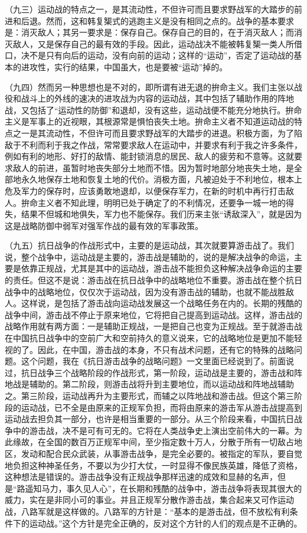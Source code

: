 （九三）运动战的特点之一，是其流动性，不但许可而且要求野战军的大踏步的前进和后退。然而，这和韩复榘式的逃跑主义是没有相同之点的。战争的基本要求是：消灭敌人；其另一要求是：保存自己。保存自己的目的，在于消灭敌人；而消灭敌人，又是保存自己的最有效的手段。因此，运动战决不能被韩复榘一类人所借口，决不是只有向后的运动，没有向前的运动；这样的“运动”，否定了运动战的基本的进攻性，实行的结果，中国虽大，也是要被“运动”掉的。

（九四）然而另一种思想也是不对的，即所谓有进无退的拚命主义。我们主张以战役和战斗上的外线的速决的进攻战为内容的运动战，其中包括了辅助作用的阵地战，又包括了“运动性的防御”和退却，没有这些，运动战便不能充分地执行。拚命主义是军事上的近视眼，其根源常是惧怕丧失土地。拚命主义者不知道运动战的特点之一是其流动性，不但许可而且要求野战军的大踏步的进退。积极方面，为了陷敌于不利而利于我之作战，常常要求敌人在运动中，并要求有利于我之许多条件，例如有利的地形、好打的敌情、能封锁消息的居民、敌人的疲劳和不意等。这就要求敌人的前进，虽暂时地丧失部分土地而不惜。因为暂时地部分地丧失土地，是全部地永久地保存土地和恢复土地的代价。消极方面，凡被迫处于不利地位，根本上危及军力的保存时，应该勇敢地退却，以便保存军力，在新的时机中再行打击敌人。拚命主义者不知此理，明明已处于确定了的不利情况，还要争一城一地的得失，结果不但城和地俱失，军力也不能保存。我们历来主张“诱敌深入”，就是因为这是战略防御中弱军对强军作战的最有效的军事政策。

（九五）抗日战争的作战形式中，主要的是运动战，其次就要算游击战了。我们说，整个战争中，运动战是主要的，游击战是辅助的，说的是解决战争的命运，主要是依靠正规战，尤其是其中的运动战，游击战不能担负这种解决战争命运的主要的责任。但这不是说：游击战在抗日战争中的战略地位不重要。游击战在整个抗日战争中的战略地位，仅仅次于运动战，因为没有游击战的辅助，也就不能战胜敌人。这样说，是包括了游击战向运动战发展这一个战略任务在内的。长期的残酷的战争中间，游击战不停止于原来地位，它将把自己提高到运动战。这样，游击战的战略作用就有两方面：一是辅助正规战，一是把自己也变为正规战。至于就游击战在中国抗日战争中的空前广大和空前持久的意义说来，它的战略地位是更加不能轻视的了。因此，在中国，游击战的本身，不只有战术问题，还有它的特殊的战略问题。这个问题，我在《抗日游击战争的战略问题》一文里面已经说到了。前面说过，抗日战争三个战略阶段的作战形式，第一阶段，运动战是主要的，游击战和阵地战是辅助的。第二阶段，则游击战将升到主要地位，而以运动战和阵地战辅助之。第三阶段，运动战再升为主要形式，而辅之以阵地战和游击战。但这个第三阶段的运动战，已不全是由原来的正规军负担，而将由原来的游击军从游击战提高到运动战去担负其一部分，也许是相当重要的一部分。从三个阶段来看，中国抗日战争中的游击战，决不是可有可无的。它将在人类战争史上演出空前伟大的一幕。为此缘故，在全国的数百万正规军中间，至少指定数十万人，分散于所有一切敌占地区，发动和配合民众武装，从事游击战争，是完全必要的。被指定的军队，要自觉地负担这种神圣任务，不要以为少打大仗，一时显得不像民族英雄，降低了资格，这种想法是错误的。游击战争没有正规战争那样迅速的成效和显赫的名声，但是“路遥知马力，事久见人心”，在长期和残酷的战争中，游击战争将表现其很大的威力，实在是非同小可的事业。并且正规军分散作游击战，集合起来又可作运动战，八路军就是这样做的。八路军的方针是：“基本的是游击战，但不放松有利条件下的运动战。”这个方针是完全正确的，反对这个方针的人们的观点是不正确的。

